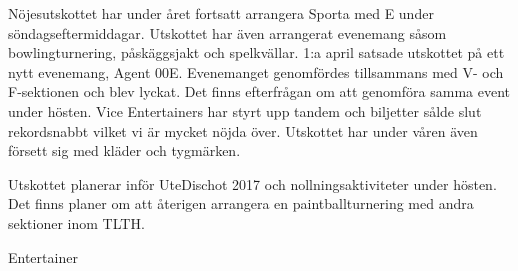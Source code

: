 \documentclass[../_main/handlingar.tex]{subfiles}
\begin{document}
Nöjesutskottet har under året fortsatt arrangera Sporta med E under söndagseftermiddagar. Utskottet har även arrangerat evenemang såsom bowlingturnering, påskäggsjakt och spelkvällar. 1:a april satsade utskottet på ett nytt evenemang, Agent 00E. Evenemanget genomfördes tillsammans med V- och F-sektionen och blev lyckat. Det finns efterfrågan om att genomföra samma event under hösten. Vice Entertainers har styrt upp tandem och biljetter sålde slut rekordsnabbt vilket vi är mycket nöjda över. Utskottet har under våren även försett sig med kläder och tygmärken.

Utskottet planerar inför UteDischot 2017 och nollningsaktiviteter under hösten. Det finns planer om att återigen arrangera en paintballturnering med andra sektioner inom TLTH.
\begin{signatures}{1}
    \mvh
    \signature{Albin Nyström Eklund}{Entertainer}
\end{signatures}
\end{document}
